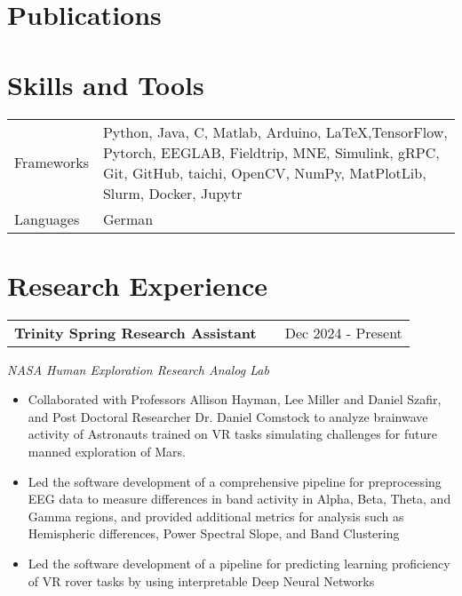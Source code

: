 \documentclass[a4paper,10pt]{article}
\makeatletter
\newenvironment{joblong}[3]
    {
    \begin{tabularx}{\linewidth}{@{}l X r@{}}
    \textbf{#1} & \hfill &  #2 \\[3.75pt]
    \end{tabularx}
    \begin{minipage}[t]{\linewidth}
    \textit{#3}
    
    \begin{itemize}[nosep,after=\strut, leftmargin=1em, itemsep=3pt,label=--]
    }
    {
    \end{itemize}
    \end{minipage}    
    }
\makeatother
\begin{document}
\section{Publications}
\begin{refsection}
\nocite{*}
\printbibliography[heading=none]
\end{refsection}



\section{Skills and Tools}

\begin{tabularx}{\linewidth}{@{}l X@{}}
Frameworks &  \normalsize{Python, Java, C, Matlab, Arduino, \LaTeX,TensorFlow, Pytorch, EEGLAB, Fieldtrip, MNE, Simulink, gRPC, Git, GitHub, taichi, OpenCV, NumPy, MatPlotLib, Slurm, Docker, Jupytr}\\
Languages & \normalsize{German}  
\end{tabularx}



\section{Research Experience}
\begin{joblong}{Trinity Spring Research Assistant}{Dec 2024 - Present}{NASA Human Exploration Research Analog Lab}
 \item  Collaborated with  Professors Allison Hayman, Lee Miller and Daniel Szafir, and Post Doctoral Researcher Dr. Daniel Comstock to analyze brainwave activity of Astronauts trained  on VR tasks simulating challenges for future manned exploration of Mars.   
\item Led the software development of a comprehensive pipeline for preprocessing EEG data to measure differences in band activity in Alpha, Beta, Theta, and Gamma regions, and provided additional metrics for analysis such as Hemispheric differences, Power Spectral Slope, and Band Clustering
\item Led the software development of a pipeline for predicting learning proficiency of VR rover tasks by using interpretable Deep Neural Networks
\end{joblong}
\end{document}
